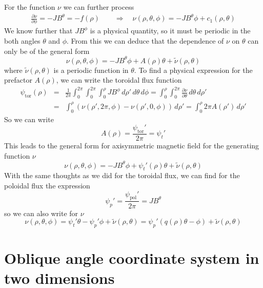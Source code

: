 \documentclass[12pt]{report}
\begin{document}
\bigskip
For the function $\nu$ we can further process
\begin{eqnarray*}
  \frac{\partial \nu}{\partial\phi}=-JB^\theta=-f(\rho)
  \qquad\Longrightarrow\quad
  \nu(\rho,\theta,\phi) = -JB^\theta \phi+c_1(\rho,\theta)
\end{eqnarray*}
We know further that $JB^\phi$ is a physical quantity, so it must be
periodic in the both angles $\theta$ and $\phi$. From this we can
deduce that the dependence of $\nu$ on $\theta$ can only be of the
general form
\begin{displaymath}
  \nu(\rho,\theta,\phi)= -JB^\theta \phi+A(\rho)\theta+\tilde\nu(\rho,\theta)
\end{displaymath}
where $\tilde\nu(\rho,\theta)$ is a periodic function in $\theta$.
To find a physical expression for the prefactor $A(\rho)$, we can
write the toroidal flux function
\begin{eqnarray*}
  \psi_\mathrm{tor}(\rho)&=&\frac{1}{2\pi}\int_0^{2\pi}\int_0^{2\pi}\int_0^\rho JB^\phi\,d\rho'\,d\theta\,d\phi
  = \int_0^\rho\int_0^{2\pi} \frac{\partial\nu}{\partial\theta}\,d\theta\,d\rho'\\
  &=&\int_0^\rho (\nu(\rho',2\pi,\phi)-\nu(\rho',0,\phi))\,d\rho'
  = \int_0^\rho 2\pi A(\rho')\,d\rho'
\end{eqnarray*}
So we can write
\begin{displaymath}
  A(\rho) = \frac{\psi_\mathrm{tor}'}{2\pi} = \psi_t'
\end{displaymath}
This leads to the general form for axisymmetric magnetic field for the
generating function $\nu$
\begin{displaymath}
  \nu(\rho,\theta,\phi)=-JB^\theta \phi+\psi_t'(\rho)\theta+\tilde\nu(\rho,\theta)
\end{displaymath}
With the same thoughts as we did for the toroidal flux, we can find
for the poloidal flux the expression
\begin{displaymath}
  \psi_p'=\frac{\psi_\mathrm{pol}'}{2\pi}=JB^\theta
\end{displaymath}
so we can also write for $\nu$
\begin{displaymath}
  \nu(\rho,\theta,\phi)=\psi_t'\theta-\psi_p'\phi+\tilde\nu(\rho,\theta)
  =\psi_p'\left(
    q(\rho)\theta-\phi
  \right)+\tilde\nu(\rho,\theta)
\end{displaymath}


\section{Oblique angle coordinate system in two dimensions}
\label{sec:gengeom}
\end{document}

